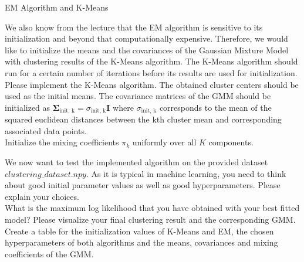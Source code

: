 \documentclass[
	ngerman,
	points=true,%
    solution=true,
    accentcolor=9c,
    colorbacktitle
	]{tudaexercise}
\begin{document}
\begin{task}{EM Algorithm and K-Means}
\begin{solution}
\end{solution}

\begin{subtask}
We also know from the lecture that the EM algorithm is sensitive to its initialization and beyond that computationally expensive. Therefore, we would like to initialize the means and the covariances of the Gaussian Mixture Model with clustering results of the K-Means algorithm. The K-Means algorithm should run for a certain number of iterations before its results are used for initialization. \\
Please implement the K-Means algorithm. The obtained cluster centers should be used as the initial means. The covariance matrices of the GMM should be initialized as $\boldsymbol{\Sigma}_{\text{init, k}}=\sigma_{\text{init, k}}\boldsymbol{I}$ where $\sigma_{\text{init, k}}$ corresponds to the mean of the squared euclidean distances between the kth cluster mean and corresponding associated data points. \\ 
Initialize the mixing coefficients $\pi_k$ uniformly over all $K$ components. 
\end{subtask}
\begin{solution}
    
\end{solution}

\begin{subtask}
We now want to test the implemented algorithm on the provided dataset $clustering\_dataset.npy$. As it is typical in machine learning, you need to think about good initial parameter values as well as good hyperparameters. Please explain your choices. \\ What is the maximum log likelihood that you have obtained with your best fitted model? Please visualize your final clustering result and the corresponding GMM. Create a table for the initialization values of K-Means and EM, the chosen hyperparameters of both algorithms and the means, covariances and mixing coefficients of the GMM.
\end{subtask}
\begin{solution}
    
\end{solution}


\end{task}
\end{document}
